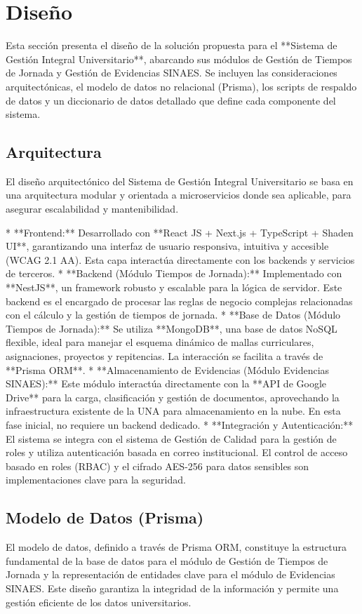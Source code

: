 
\section{Diseño}
Esta sección presenta el diseño de la solución propuesta para el **Sistema de Gestión Integral Universitario**, abarcando sus módulos de Gestión de Tiempos de Jornada y Gestión de Evidencias SINAES. Se incluyen las consideraciones arquitectónicas, el modelo de datos no relacional (Prisma), los scripts de respaldo de datos y un diccionario de datos detallado que define cada componente del sistema.

\subsection{Arquitectura}
El diseño arquitectónico del Sistema de Gestión Integral Universitario se basa en una arquitectura modular y orientada a microservicios donde sea aplicable, para asegurar escalabilidad y mantenibilidad.

* **Frontend:** Desarrollado con **React JS + Next.js + TypeScript + Shaden UI**, garantizando una interfaz de usuario responsiva, intuitiva y accesible (WCAG 2.1 AA). Esta capa interactúa directamente con los backends y servicios de terceros.
* **Backend (Módulo Tiempos de Jornada):** Implementado con **NestJS**, un framework robusto y escalable para la lógica de servidor. Este backend es el encargado de procesar las reglas de negocio complejas relacionadas con el cálculo y la gestión de tiempos de jornada.
* **Base de Datos (Módulo Tiempos de Jornada):** Se utiliza **MongoDB**, una base de datos NoSQL flexible, ideal para manejar el esquema dinámico de mallas curriculares, asignaciones, proyectos y repitencias. La interacción se facilita a través de **Prisma ORM**.
* **Almacenamiento de Evidencias (Módulo Evidencias SINAES):** Este módulo interactúa directamente con la **API de Google Drive** para la carga, clasificación y gestión de documentos, aprovechando la infraestructura existente de la UNA para almacenamiento en la nube. En esta fase inicial, no requiere un backend dedicado.
* **Integración y Autenticación:** El sistema se integra con el sistema de Gestión de Calidad para la gestión de roles y utiliza autenticación basada en correo institucional. El control de acceso basado en roles (RBAC) y el cifrado AES-256 para datos sensibles son implementaciones clave para la seguridad.

\subsection{Modelo de Datos (Prisma)}
El modelo de datos, definido a través de Prisma ORM, constituye la estructura fundamental de la base de datos para el módulo de Gestión de Tiempos de Jornada y la representación de entidades clave para el módulo de Evidencias SINAES. Este diseño garantiza la integridad de la información y permite una gestión eficiente de los datos universitarios.

